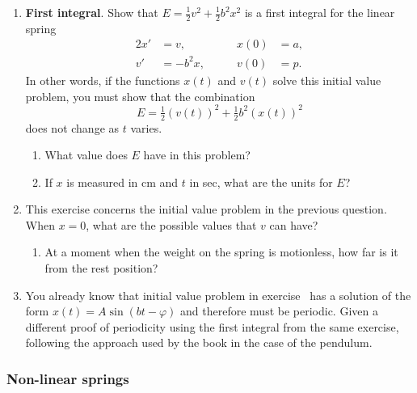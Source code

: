 \begin{enumerate}
\item {\bf First integral}. Show that $E =
\tfrac{1}{2}v^2 + \tfrac{1}{2} b^2 x^2$ is a first integral for the
linear spring
\begin{alignat*}{2}
x' &= v,      &\qquad  x(0) &= a, \\
v' &= -b^2 x, &\qquad  v(0) &= p.
\end{alignat*}
In other words, if the functions $x(t)$ and $v(t)$ solve this initial
value problem, you must show that the combination
	\[
E = \tfrac{1}{2}\left(v(t)\right)^2 + 
		\tfrac{1}{2} b^2 \left(x(t)\right)^2
\]
does not change as $t$ varies.




  \begin{enumerate}
  \item What value does $E$ have in this problem?

  \item If $x$ is measured in cm and $t$ in sec, what are the units for
$E$?


\end{enumerate}
\item This exercise concerns the initial value problem in the previous
question.  When $x = 0$, what are the possible values that $v$ can
have?

  \begin{enumerate}
  \item At a moment when the weight on the spring is motionless, how far
is it from the rest position?


\end{enumerate}
\item You already know that initial value problem in exercise
\thefirstintexercise\ has a solution of the form $x(t) = A\sin(bt -
\varphi)$ and therefore must be periodic.  Given a different proof of
periodicity using the first integral from the same exercise, following
the approach used by the book in the case of the pendulum. 



\end{enumerate}
\subsubsection{Non-linear springs}
\label{subsubsec:non-linear-springs}




